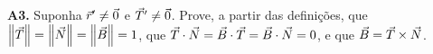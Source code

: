\documentclass[11pt,a4paper]{article}
\begin{document}
\begin{exercicio}
\textbf{A3.} Suponha \(\vec{r}'\neq\vec{0}\) e \(\vec{T}'\neq\vec{0}\). Prove, a partir das definições, que \(\left\lVert \vec{T} \right\rVert=\left\lVert \vec{N} \right\rVert=\left\lVert \vec{B} \right\rVert=1\), que \(\vec{T}\cdot\vec{N}=\vec{B}\cdot\vec{T}=\vec{B}\cdot\vec{N}=0\), e que \(\vec{B}=\vec{T}\times\vec{N}\).
\end{exercicio}
\end{document}
